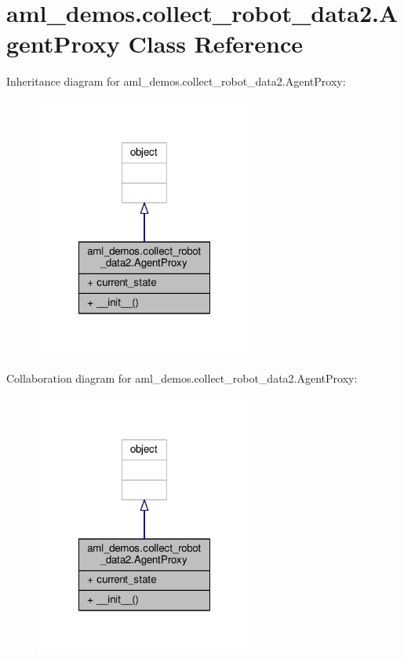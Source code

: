 \hypertarget{classaml__demos_1_1collect__robot__data2_1_1_agent_proxy}{\section{aml\-\_\-demos.\-collect\-\_\-robot\-\_\-data2.\-Agent\-Proxy Class Reference}
\label{classaml__demos_1_1collect__robot__data2_1_1_agent_proxy}
}


Inheritance diagram for aml\-\_\-demos.\-collect\-\_\-robot\-\_\-data2.\-Agent\-Proxy\-:
\nopagebreak
\begin{figure}[H]
\begin{center}
\leavevmode
\includegraphics[width=204pt]{classaml__demos_1_1collect__robot__data2_1_1_agent_proxy__inherit__graph}
\end{center}
\end{figure}


Collaboration diagram for aml\-\_\-demos.\-collect\-\_\-robot\-\_\-data2.\-Agent\-Proxy\-:
\nopagebreak
\begin{figure}[H]
\begin{center}
\leavevmode
\includegraphics[width=204pt]{classaml__demos_1_1collect__robot__data2_1_1_agent_proxy__coll__graph}
\end{center}
\end{figure}
